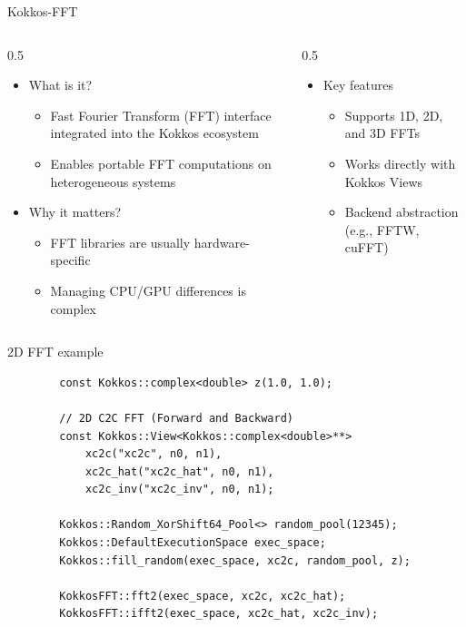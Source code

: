 \documentclass[
    aspectratio=169,
]{beamer}
\begin{document}
\begin{frame}{Kokkos-FFT}
    \begin{columns}
        \begin{column}{0.5\linewidth}
            \begin{itemize}
                \item What is it?
                \begin{itemize}
                    \item Fast Fourier Transform (FFT) interface integrated into the Kokkos ecosystem
                    \item Enables portable FFT computations on heterogeneous systems
                \end{itemize}
                \item Why it matters?
                \begin{itemize}
                    \item FFT libraries are usually hardware-specific
                    \item Managing CPU/GPU differences is complex
                \end{itemize}
            \end{itemize}
        \end{column}
        \begin{column}{0.5\linewidth}
            \begin{itemize}
                \item Key features
                \begin{itemize}
                    \item Supports 1D, 2D, and 3D FFTs
                    \item Works directly with Kokkos Views
                    \item Backend abstraction (e.g., FFTW, cuFFT)
                \end{itemize}
            \end{itemize}
        \end{column}
    \end{columns}
\end{frame}

\begin{frame}[fragile]{2D FFT example}
    \begin{verbatim}
        const Kokkos::complex<double> z(1.0, 1.0);

        // 2D C2C FFT (Forward and Backward)
        const Kokkos::View<Kokkos::complex<double>**>
            xc2c("xc2c", n0, n1),
            xc2c_hat("xc2c_hat", n0, n1),
            xc2c_inv("xc2c_inv", n0, n1);

        Kokkos::Random_XorShift64_Pool<> random_pool(12345);
        Kokkos::DefaultExecutionSpace exec_space;
        Kokkos::fill_random(exec_space, xc2c, random_pool, z);

        KokkosFFT::fft2(exec_space, xc2c, xc2c_hat);
        KokkosFFT::ifft2(exec_space, xc2c_hat, xc2c_inv);
    \end{verbatim}
\end{frame}
\end{document}
